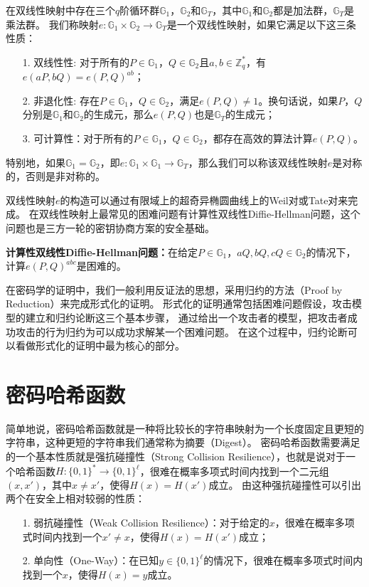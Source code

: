 在双线性映射中存在三个$q$阶循环群$\mathbb{G}_1$，$\mathbb{G}_2$和$\mathbb{G}_T$，其中$\mathbb{G}_1$和$\mathbb{G}_2$都是加法群，$\mathbb{G}_T$是乘法群。
我们称映射$e:\mathbb{G}_1\times\mathbb{G}_2\rightarrow \mathbb{G}_T$是一个双线性映射，如果它满足以下这三条性质：
\begin{itemize}
  \item[1.] 双线性性: 对于所有的$P\in \mathbb{G}_1$，$Q\in \mathbb{G}_2$且$a,b\in\mathbb{Z}_q^*$，有$e(aP,bQ)=e(P,Q)^{ab}$；
  \item[2.] 非退化性: 存在$P\in \mathbb{G}_1$，$Q\in \mathbb{G}_2$，满足$e(P,Q)\neq1$。换句话说，如果$P$，$Q$分别是$\mathbb{G}_1$和$\mathbb{G}_2$的生成元，那么$e(P,Q)$也是$\mathbb{G}_T$的生成元；
  \item[3.] 可计算性：对于所有的$P\in\mathbb{G}_1$，$Q\in\mathbb{G}_2$，都存在高效的算法计算$e(P,Q)$。  
\end{itemize}
特别地，如果$\mathbb{G}_1=\mathbb{G}_2$，即$e:\mathbb{G}_1\times \mathbb{G}_1\rightarrow \mathbb{G}_T$，那么我们可以称该双线性映射$e$是对称的，否则是非对称的。

双线性映射$e$的构造可以通过有限域上的超奇异椭圆曲线上的Weil对或Tate对来完成。
在双线性映射上最常见的困难问题有计算性双线性Diffie-Hellman问题，这个问题也是三方一轮的密钥协商方案\cite{joux2000one}的安全基础。

\textbf{计算性双线性Diffie-Hellman问题：}在给定$P\in\mathbb{G}_1$，$aQ,bQ,cQ\in\mathbb{G}_2$的情况下，计算$e(P,Q)^{abc}$是困难的。

在密码学的证明中，我们一般利用反证法的思想，采用归约的方法（Proof by Reduction）来完成形式化的证明。
形式化的证明通常包括困难问题假设，攻击模型的建立和归约论断这三个基本步骤，
通过给出一个攻击者的模型，把攻击者成功攻击的行为归约为可以成功求解某一个困难问题。
在这个过程中，归约论断可以看做形式化的证明中最为核心的部分。

\section{密码哈希函数}

简单地说，密码哈希函数就是一种将比较长的字符串映射为一个长度固定且更短的字符串，这种更短的字符串我们通常称为摘要（Digest）。
密码哈希函数需要满足的一个基本性质就是强抗碰撞性（Strong Collision Resilience），也就是说对于一个哈希函数$H:\{0,1\}^*\rightarrow \{0,1\}^\ell$，很难在概率多项式时间内找到一个二元组$(x,x')$，其中$x\neq x'$，使得$H(x)=H(x')$成立。
由这种强抗碰撞性可以引出两个在安全上相对较弱的性质：

\begin{itemize}
  \item[1.] 弱抗碰撞性（Weak Collision Resilience）：对于给定的$x$，很难在概率多项式时间内找到一个$x'\neq x$，使得$H(x)=H(x')$成立；
  \item[2.] 单向性（One-Way）：在已知$y\in \{0,1\}^\ell$的情况下，很难在概率多项式时间内找到一个$x$，使得$H(x)=y$成立。
\end{itemize}

